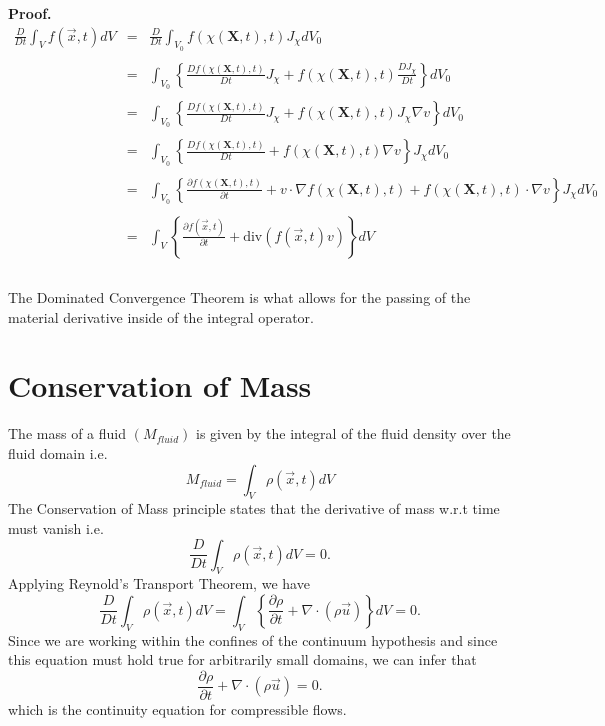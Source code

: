 \textbf{Proof.}
\begin{eqnarray*}
 \frac{D}{Dt} \int_{V} f(\stackrel{\rightarrow}{x},t)dV &=& \frac{D}{Dt} \int_{V_{0}} f(\chi(\textbf{X},t),t)J_{\chi}dV_{0}\\ \\
 &=& \int_{V_{0}}\left\{\frac{Df(\chi(\textbf{X},t),t)}{Dt}J_{\chi} + f(\chi(\textbf{X},t),t)\frac{DJ_{\chi}}{Dt}\right\}dV_{0}\\ \\ 
 &=& \int_{V_{0}}\left\{\frac{Df(\chi(\textbf{X},t),t)}{Dt}J_{\chi} + f(\chi(\textbf{X},t),t)J_{\chi}\nabla v\right\}dV_{0}\\ \\
 &=& \int_{V_{0}}\left\{\frac{Df(\chi(\textbf{X},t),t)}{Dt} + f(\chi(\textbf{X},t),t)\nabla v\right\}J_{\chi}dV_{0}\\ \\
 &=& \int_{V_{0}}\left\{\frac{\partial f(\chi(\textbf{X},t),t)}{\partial t} + v\cdot \nabla f(\chi(\textbf{X},t),t) + f(\chi(\textbf{X},t),t)\cdot \nabla v\right\}J_{\chi}dV_{0}\\ \\
 &=& \int_{V}\left\{\frac{\partial f(\stackrel{\rightarrow}{x},t)}{\partial t} + \mbox{div}(f(\stackrel{\rightarrow}{x},t)v)\right\}dV\\ \\
 \end{eqnarray*}

The Dominated Convergence Theorem is what allows for the passing of the material derivative inside of the integral operator.


\section{Conservation of Mass}


The mass of a fluid $(M_{fluid})$ is given by the integral of the fluid density over the fluid domain i.e. \begin{equation} M_{fluid} = \int_{V} \rho(\stackrel{\rightarrow}{x},t)dV \end{equation}
The Conservation of Mass principle states that the derivative of mass w.r.t time must vanish i.e. \begin{equation} \frac{D}{Dt} \int_{V} \rho(\stackrel{\rightarrow}{x},t)dV = 0. \end{equation}
Applying Reynold's Transport Theorem, we have \begin{equation} \frac{D}{Dt} \int_{V} \rho(\stackrel{\rightarrow}{x},t)dV = \int_{V} \left\{\frac{\partial \rho}{\partial t} + \nabla \cdot(\rho \stackrel{\rightarrow}{u})\right\}dV = 0. \end{equation} Since we are working within the confines of the continuum hypothesis and since this equation must hold true for arbitrarily small domains, we can infer that \begin{equation}\label{cce} \frac{\partial \rho}{\partial t} + \nabla \cdot(\rho \stackrel{\rightarrow}{u}) = 0.\end{equation} which is the continuity equation for compressible flows.

